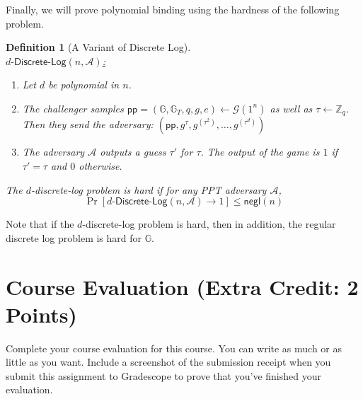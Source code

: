 \documentclass[11pt]{article}
\newcommand{\A}{\mathcal{A}}
\newcommand{\G}{\mathcal{G}}
\newcommand{\GG}{\mathbb{G}}
\newcommand{\pp}{\mathsf{pp}}
\newcommand{\ZZ}{\mathbb{Z}}
\newcommand{\negl}{\mathsf{negl}}
\newtheorem{definition}[theorem]{Definition}
\numberwithin{equation}{section}
\begin{document}
Finally, we will prove polynomial binding using the hardness of the following problem.
\begin{definition}[A Variant of Discrete Log]\label{def:d-discrete-log}
$ $\\
\noindent\underline{$d\text{-}\mathsf{Discrete}\text{-}\mathsf{Log}(n, \A)$:}
\begin{enumerate}
    \item Let $d$ be polynomial in $n$. 
    \item The challenger samples $\pp = (\GG, \GG_T, q, g, e) \leftarrow \G(1^n)$ as well as $\tau \leftarrow \ZZ_q$. Then they send the adversary:
    $\left(\pp, g^{\tau}, g^{(\tau^2)}, \dots, g^{(\tau^{d})}\right)$
    \item The adversary $\A$ outputs a guess $\tau'$ for $\tau$. The output of the game is $1$ if $\tau' = \tau$ and $0$ otherwise.
\end{enumerate}
The $d$-discrete-log problem is hard if for any PPT adversary $\A$, 
\[\Pr[d\text{-}\mathsf{Discrete}\text{-}\mathsf{Log}(n, \A) \to 1] \leq \negl(n)\]
\end{definition}
Note that if the $d$-discrete-log problem is hard, then in addition, the regular discrete log problem is hard for $\GG$.
\pagebreak

\section{Course Evaluation (Extra Credit: 2 Points)}
Complete your course evaluation for this course. You can write as much or as little as you want. Include a screenshot of the submission receipt when you submit this assignment to Gradescope to prove that you've finished your evaluation.\pagebreak
\end{document}
